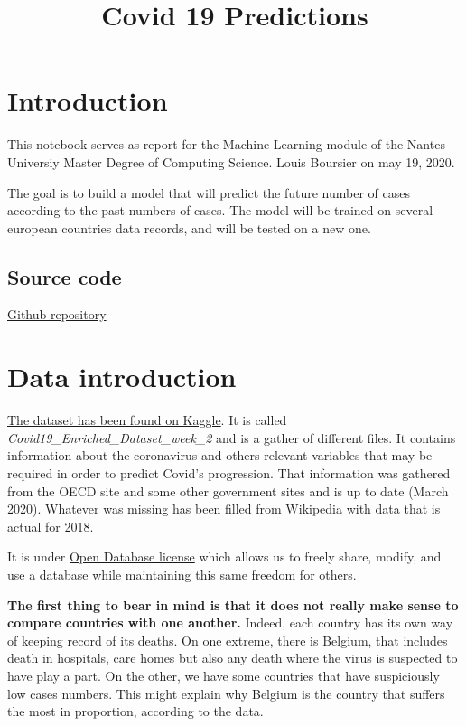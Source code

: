 \documentclass[11pt]{article}
\title{Covid 19 Predictions}
\begin{document}
    
    
    \maketitle
    
    

    
    \hypertarget{introduction}{%
\section{Introduction}\label{introduction}}

This notebook serves as report for the Machine Learning module of the
Nantes Universiy Master Degree of Computing Science. Louis Boursier on
may 19, 2020.

The goal is to build a model that will predict the future number of
cases according to the past numbers of cases. The model will be trained
on several european countries data records, and will be tested on a new
one.

\hypertarget{source-code}{%
\subsection{Source code}\label{source-code}}

\href{https://github.com/loutouk/Covid19_Prediction}{Github repository}

\hypertarget{data-introduction}{%
\section{Data introduction}\label{data-introduction}}

\href{https://www.kaggle.com/optimo/covid19-enriched-dataset-week-2}{The
dataset has been found on Kaggle}. It is called
\emph{Covid19\_Enriched\_Dataset\_week\_2} and is a gather of different
files. It contains information about the coronavirus and others relevant
variables that may be required in order to predict Covid's progression.
That information was gathered from the OECD site and some other
government sites and is up to date (March 2020). Whatever was missing
has been filled from Wikipedia with data that is actual for 2018.

It is under \href{https://opendatacommons.org/licenses/dbcl/1.0/}{Open
Database license} which allows us to freely share, modify, and use a
database while maintaining this same freedom for others.

\textbf{The first thing to bear in mind is that it does not really make
sense to compare countries with one another.} Indeed, each country has
its own way of keeping record of its deaths. On one extreme, there is
Belgium, that includes death in hospitals, care homes but also any death
where the virus is suspected to have play a part. On the other, we have
some countries that have suspiciously low cases numbers. This might
explain why Belgium is the country that suffers the most in proportion,
according to the data.
\end{document}
